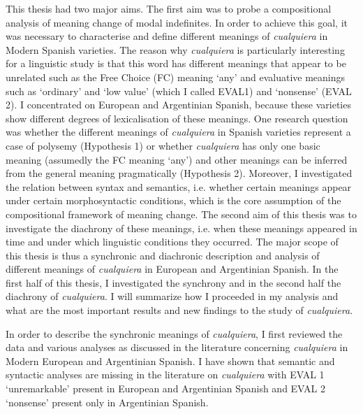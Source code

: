 This thesis had two major aims. The first aim was to probe a compositional analysis of meaning change of modal indefinites. In order to achieve this goal, it was necessary to characterise and define different meanings of \textit{cualquiera} in Modern Spanish varieties. The reason why \textit{cualquiera} is particularly interesting for a linguistic study is that this word has different meanings that appear to be unrelated such as the Free Choice (FC) meaning ‘any’ and evaluative meanings such as ‘ordinary’ and ‘low value’ (which I called EVAL1) and ‘nonsense’ (EVAL 2). I concentrated on European and Argentinian Spanish, because these varieties show different degrees of lexicalisation of these meanings. One research question was whether the different meanings of \textit{cualquiera} in Spanish varieties represent a case of polysemy (Hypothesis 1) or whether \textit{cualquiera} has only one basic meaning (assumedly the FC meaning ‘any’) and other meanings can be inferred from the general meaning pragmatically (Hypothesis 2). Moreover, I investigated the relation between syntax and semantics, i.e. whether certain meanings appear under certain morphosyntactic conditions, which is the core assumption of the compositional framework of meaning change. The second aim of this thesis was to investigate the diachrony of these meanings, i.e. when these meanings appeared in time and under which linguistic conditions they occurred. The major scope of this thesis is thus a synchronic and diachronic description and analysis of different meanings of \textit{cualquiera} in European and Argentinian Spanish. In the first half of this thesis, I investigated the synchrony and in the second half the diachrony of \textit{cualquiera}. I will summarize how I proceeded in my analysis and what are the most important results and new findings to the study of \textit{cualquiera}.

  In order to describe the synchronic meanings of \textit{cualquiera}, I first reviewed the data and various analyses as discussed in the literature concerning \textit{cualquiera} in Modern European and Argentinian Spanish. I have shown that semantic and syntactic analyses are missing in the literature on \textit{cualquiera} with EVAL 1 ‘unremarkable’ present in European and Argentinian Spanish and EVAL 2 ‘nonsense’ present only in Argentinian Spanish.

